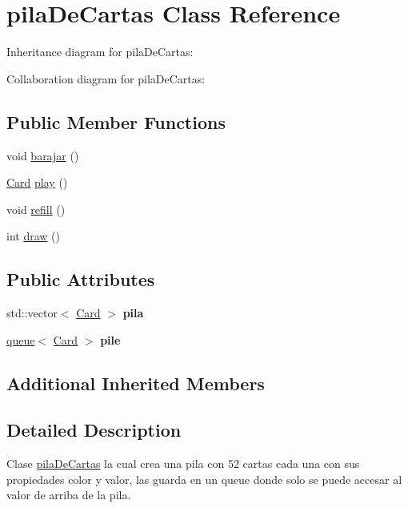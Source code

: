 \hypertarget{classpila_de_cartas}{}\section{pila\+De\+Cartas Class Reference}
\label{classpila_de_cartas}


Inheritance diagram for pila\+De\+Cartas\+:


Collaboration diagram for pila\+De\+Cartas\+:
\subsection*{Public Member Functions}
\begin{DoxyCompactItemize}
\item 
void \hyperlink{classpila_de_cartas_a16bac9885441ef926ba74ee6322a9663}{barajar} ()
\item 
\hyperlink{class_card}{Card} \hyperlink{classpila_de_cartas_a9071896c634ec2a18fa384b57981a55a}{play} ()
\item 
void \hyperlink{classpila_de_cartas_a456bcaa53157a7552296286bf59a7863}{refill} ()
\item 
int \hyperlink{classpila_de_cartas_adb97b212f1d9f4b32724eb23633d206f}{draw} ()
\end{DoxyCompactItemize}
\subsection*{Public Attributes}
\begin{DoxyCompactItemize}
\item 
std\+::vector$<$ \hyperlink{class_card}{Card} $>$ {\bfseries pila}\hypertarget{classpila_de_cartas_a59a48258f01a185c1e99f935a871338c}{}\label{classpila_de_cartas_a59a48258f01a185c1e99f935a871338c}

\item 
\hyperlink{classqueue}{queue}$<$ \hyperlink{class_card}{Card} $>$ {\bfseries pile}\hypertarget{classpila_de_cartas_aa9aac4fe6c49a5c4b1c6d0c8b4e7db36}{}\label{classpila_de_cartas_aa9aac4fe6c49a5c4b1c6d0c8b4e7db36}

\end{DoxyCompactItemize}
\subsection*{Additional Inherited Members}


\subsection{Detailed Description}
Clase \hyperlink{classpila_de_cartas}{pila\+De\+Cartas} la cual crea una pila con 52 cartas cada una con sus propiedades color y valor, las guarda en un queue donde solo se puede accesar al valor de arriba de la pila. 

